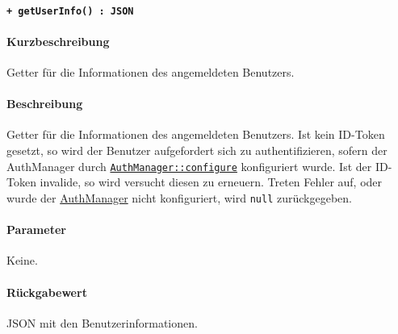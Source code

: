 \paragraph{\texttt{+ getUserInfo() : JSON}}\label{AP_AuthManager_getUserInfo}%
\paragraph*{Kurzbeschreibung}
Getter für die Informationen des angemeldeten Benutzers.
\paragraph*{Beschreibung}
Getter für die Informationen des angemeldeten Benutzers.
Ist kein ID-Token gesetzt, so wird der Benutzer aufgefordert sich zu authentifizieren, sofern der AuthManager durch \hyperref[AP_AuthManager_configure]{\texttt{AuthManager::configure}} konfiguriert wurde.
Ist der ID-Token invalide, so wird versucht diesen zu erneuern.
Treten Fehler auf, oder wurde der \hyperref[AP_AuthManager]{AuthManager} nicht konfiguriert, wird \verb#null# zurückgegeben.
\paragraph*{Parameter}
Keine.
\paragraph*{Rückgabewert}
JSON mit den Benutzerinformationen.